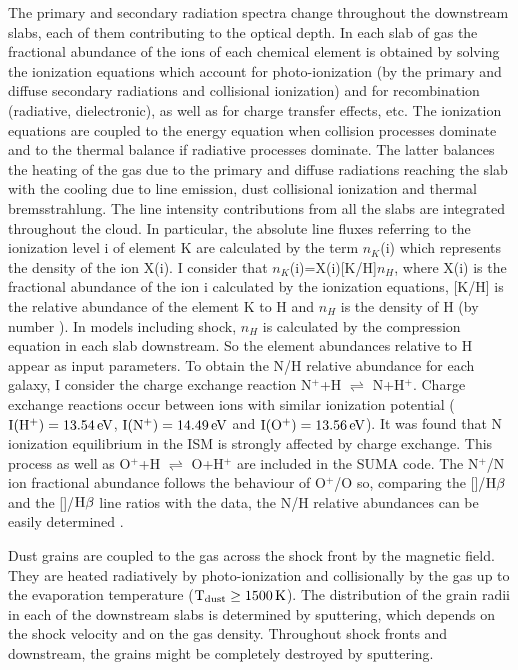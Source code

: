 \documentclass[../thesis.tex]{subfiles}
\begin{document}
The primary and secondary radiation spectra change throughout the downstream slabs, each of them contributing to the optical depth. 
In each slab of gas the fractional abundance of the ions of each chemical element is obtained by solving the ionization equations which account for photo-ionization (by the primary and diffuse secondary radiations and collisional ionization) and for  recombination (radiative, dielectronic), as well as for charge transfer effects, etc. 
The ionization equations are coupled to the energy equation when collision processes dominate \citep{Cox72} and to the thermal balance if radiative processes dominate. 
The latter balances the heating of the gas due to the primary and diffuse radiations reaching the slab with the cooling due to  
line emission, dust collisional ionization and thermal bremsstrahlung. 
The line intensity contributions from all the slabs are integrated throughout the cloud.
In particular, the absolute line fluxes referring to the ionization level i of element K are calculated by the term $n_K$(i) which represents the density of the ion X(i).
I consider that $n_K$(i)=X(i)[K/H]$n_H$, where X(i) is the fractional abundance of the ion i calculated by the ionization equations, [K/H] is the relative abundance of the element K to H and $n_H$ is the density of H (by number ). 
In models including shock, $n_H$ is calculated by the compression equation in each slab downstream. 
So the element abundances relative to H appear as input parameters.
To obtain the N/H relative abundance for each galaxy, I consider the charge exchange reaction  N$^+$+H $\rightleftharpoons$ N+H$^+$. 
Charge exchange reactions occur between ions with similar ionization potential ($\rm I(H^+)=13.54\,\si{ eV}$, $\rm I(N^+)=14.49\, \si{eV}$ and $\rm I(O^+)=13.56\,\si{ eV}$). 
It was found that N ionization equilibrium in the ISM is strongly affected by charge exchange.  
This process as well as O$^+$+H $\rightleftharpoons$ O+H$^+$  are included in the SUMA code.
The N$^+$/N ion fractional abundance follows the behaviour of O$^+$/O so, comparing the []/$\rm H\beta$   and the []/$\rm H\beta$ line ratios with the data, the N/H relative abundances can be easily determined \citep[see][]{Contini12}.


Dust grains are coupled to the gas across the shock front by the magnetic field. 
They are heated radiatively by photo-ionization and collisionally by the gas up to the evaporation temperature ($\rm T_{\rm dust} \geq 1500\,\si{K}$). 
The distribution of the grain radii in each of the downstream slabs is determined by sputtering, which depends on the shock velocity and on the gas density. 
Throughout shock fronts and downstream, the grains might be completely destroyed by sputtering.
\end{document}
